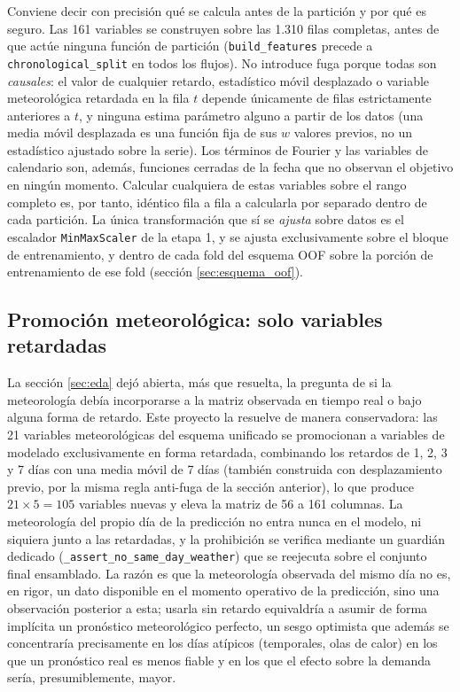 Conviene decir con precisión qué se calcula antes de la partición y por qué es seguro.
Las 161 variables se construyen sobre las 1.310 filas completas, antes de que actúe
ninguna función de partición (\texttt{build\_features} precede a
\texttt{chronological\_split} en todos los flujos). No introduce fuga porque todas son
\emph{causales}: el valor de cualquier retardo, estadístico móvil desplazado o variable
meteorológica retardada en la fila $t$ depende únicamente de filas estrictamente
anteriores a $t$, y ninguna estima parámetro alguno a partir de los datos (una media móvil
desplazada es una función fija de sus $w$ valores previos, no un estadístico ajustado
sobre la serie). Los términos de Fourier y las variables de calendario son, además,
funciones cerradas de la fecha que no observan el objetivo en ningún momento. Calcular
cualquiera de estas variables sobre el rango completo es, por tanto, idéntico fila a fila
a calcularla por separado dentro de cada partición. La única transformación que sí se
\emph{ajusta} sobre datos es el escalador \texttt{MinMaxScaler} de la etapa 1, y se ajusta
exclusivamente sobre el bloque de entrenamiento, y dentro de cada fold del esquema OOF
sobre la porción de entrenamiento de ese fold (sección \ref{sec:esquema_oof}).

\subsection{Promoción meteorológica: solo variables retardadas}\label{sec:promocion_meteo}

La sección \ref{sec:eda} dejó abierta, más que resuelta, la pregunta de si la
meteorología debía incorporarse a la matriz observada en tiempo real o bajo alguna forma
de retardo. Este proyecto la resuelve de manera conservadora: las 21 variables
meteorológicas del esquema unificado se promocionan a variables de modelado exclusivamente
en forma retardada, combinando los retardos de 1, 2, 3 y 7 días con una media móvil de 7
días (también construida con desplazamiento previo, por la misma regla anti-fuga de la
sección anterior), lo que produce $21 \times 5 = 105$ variables nuevas y eleva la matriz
de 56 a 161 columnas. La meteorología del propio día de la predicción no entra nunca en el modelo, ni siquiera
junto a las retardadas, y la prohibición se verifica mediante un guardián dedicado
(\texttt{\_assert\_no\_same\_day\_weather}) que se reejecuta sobre el conjunto final
ensamblado. La razón es que la meteorología observada del mismo día no es, en rigor, un
dato disponible en el momento operativo de la predicción, sino una observación posterior a
esta; usarla sin retardo equivaldría a asumir de forma implícita un pronóstico
meteorológico perfecto, un sesgo optimista que además se concentraría precisamente en los
días atípicos (temporales, olas de calor) en los que un pronóstico real es menos fiable y
en los que el efecto sobre la demanda sería, presumiblemente, mayor.

